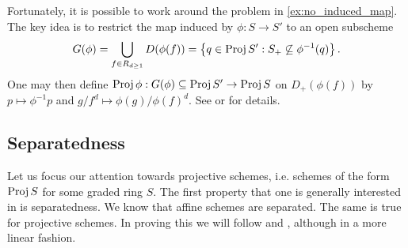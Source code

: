 \documentclass{article}
\begin{document}
Fortunately, it is possible to work around the problem in
\ref{ex:no_induced_map}. The key idea is to restrict the
map induced by $\phi : S\to S'$ to an open subscheme
\begin{align*}
  G(\phi)
  = \bigcup_{f \in R_{d\geq 1}} D(\phi(f))
  = \left\lbrace{q \in \operatorname{Proj}S' : S_+ \not\subseteq {\phi}^{-1}(q) }\right\rbrace.
\end{align*}
One may then define $\operatorname{Proj} \phi : G(\phi) \subseteq\operatorname{Proj} S' \to \operatorname{Proj} S$ on
$D_+(\phi(f))$ by $p\mapsto {\phi}^{-1}p$ and
$g/f^d \mapsto \phi(g)/\phi(f)^d$. See \cite[p. 371]{gortz2010} or
\cite[p. 139]{ellingsrud2023} for details.

\subsection{Separatedness}

Let us focus our attention towards projective schemes, i.e. schemes
of the form $\operatorname{Proj} S$ for some graded ring $S$. The first property that
one is generally interested in is separatedness. We know that affine schemes are separated. The same is true for projective schemes. In proving
this we will follow \cite[\href{https://stacks.math.columbia.edu/tag/01KP}{Tag 01KP}]{stacks-project} and \cite[\href{https://stacks.math.columbia.edu/tag/01M3}{Tag 01M3}]{stacks-project}, although in a more linear fashion.
\end{document}
